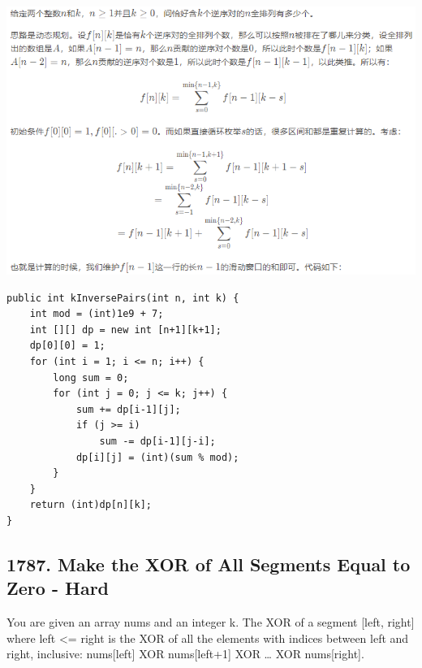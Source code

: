 \documentclass[9pt, b5paaper]{book}
\begin{document}
\begin{enumerate}
\includegraphics[width=.9\linewidth]{./pic/kinvPair.png}

\begin{verbatim}
public int kInversePairs(int n, int k) {
    int mod = (int)1e9 + 7;
    int [][] dp = new int [n+1][k+1];
    dp[0][0] = 1;
    for (int i = 1; i <= n; i++) {
        long sum = 0;
        for (int j = 0; j <= k; j++) {
            sum += dp[i-1][j];
            if (j >= i)
                sum -= dp[i-1][j-i];
            dp[i][j] = (int)(sum % mod);
        }
    }
    return (int)dp[n][k];
}
\end{verbatim}
\end{enumerate}
\subsection{1787. Make the XOR of All Segments Equal to Zero - Hard}
\label{sec-1-4-62}
You are given an array nums​​​ and an integer k​​​​​. The XOR of a segment [left, right] where left <= right is the XOR of all the elements with indices between left and right, inclusive: nums[left] XOR nums[left+1] XOR \ldots{} XOR nums[right].
\end{document}
